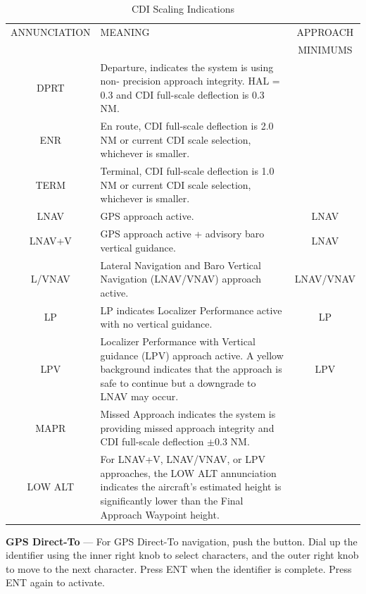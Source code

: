 \begin{table}
[htb] 
\begin{center}
\begin{tabularx}
  {\textwidth}{|c|X|c|} 
  \hline ANNUNCIATION&MEANING&APPROACH\tabularnewline
  &&MINIMUMS\\
	\hline
	\hline DPRT & Departure, indicates the system is using non- precision approach integrity. HAL = 0.3 and CDI full-scale deflection is 0.3 NM.&\\
	\hline ENR & En route, CDI full-scale deflection is 2.0 NM or current CDI scale selection, whichever is smaller.&\\
	\hline TERM & Terminal, CDI full-scale deflection is 1.0 NM or current CDI scale selection, whichever is smaller.&\\
	\hline LNAV & GPS approach active. &LNAV\\
	\hline LNAV+V & GPS approach active + advisory baro vertical guidance.&LNAV\\
	\hline L/VNAV & Lateral Navigation and Baro Vertical Navigation (LNAV/VNAV) approach active. &LNAV/VNAV\\
	\hline LP & LP indicates Localizer Performance active with no vertical guidance.&LP\\
	\hline LPV & Localizer Performance with Vertical guidance (LPV) approach active.	A yellow background indicates that the approach is safe to continue but a downgrade to LNAV may occur.&LPV\\
	\hline MAPR & Missed Approach indicates the system is providing missed approach integrity and CDI full-scale deflection $\pm $0.3 NM.&\\
  \hline LOW ALT & For LNAV+V, LNAV/VNAV, or LPV approaches, the LOW ALT annunciation indicates the aircraft's estimated height is significantly lower than the Final Approach Waypoint height.&\\
	\hline
\end{tabularx}
\caption{CDI Scaling Indications} \label{cdi}
\end{center}
\end{table}

\textbf{GPS Direct-To} --- For GPS Direct-To navigation, push the \directto button. Dial up the identifier using the inner right knob to select characters, and the outer right knob to move to the next character. Press ENT when the identifier is complete. Press ENT again to activate.

